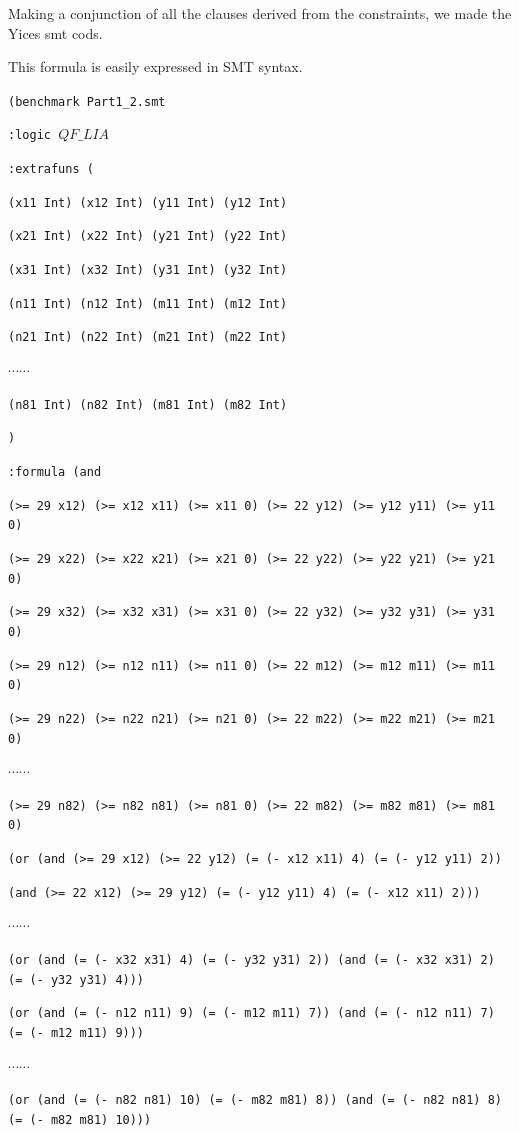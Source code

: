 \documentclass[11pt]{article}
\begin{document}
Making a conjunction of all the clauses derived from the constraints, we made the Yices smt cods.

This formula is easily expressed in SMT syntax.

{\footnotesize

{\tt (benchmark Part1\_2.smt}

{\tt :logic $QF\_LIA$}

{\tt :extrafuns (}

{\tt (x11 Int) (x12 Int) (y11 Int) (y12 Int)}

{\tt (x21 Int) (x22 Int) (y21 Int) (y22 Int)}

{\tt (x31 Int) (x32 Int) (y31 Int) (y32 Int)}

{\tt (n11 Int) (n12 Int) (m11 Int) (m12 Int)}

{\tt (n21 Int) (n22 Int) (m21 Int) (m22 Int)}

$\cdots \cdots$

{\tt (n81 Int) (n82 Int) (m81 Int) (m82 Int)}

{\tt )}

{\tt :formula (and}

{\tt (>= 29 x12) (>= x12 x11) (>= x11 0) (>= 22 y12) (>= y12 y11) (>= y11 0)}

{\tt (>= 29 x22) (>= x22 x21) (>= x21 0) (>= 22 y22) (>= y22 y21) (>= y21 0)}

{\tt (>= 29 x32) (>= x32 x31) (>= x31 0) (>= 22 y32) (>= y32 y31) (>= y31 0)}

{\tt (>= 29 n12) (>= n12 n11) (>= n11 0) (>= 22 m12) (>= m12 m11) (>= m11 0)}

{\tt (>= 29 n22) (>= n22 n21) (>= n21 0) (>= 22 m22) (>= m22 m21) (>= m21 0)}

$\cdots \cdots$

{\tt (>= 29 n82) (>= n82 n81) (>= n81 0) (>= 22 m82) (>= m82 m81) (>= m81 0)}

{\tt (or (and (>= 29 x12) (>= 22 y12) (= (- x12 x11) 4) (= (- y12 y11) 2))}

{\tt (and (>= 22 x12) (>= 29 y12) (= (- y12 y11) 4) (= (- x12 x11) 2)))}

$\cdots \cdots$

{\tt (or (and (= (- x32 x31) 4) (= (- y32 y31) 2)) (and (= (- x32 x31) 2) (= (- y32 y31) 4)))}

{\tt (or (and (= (- n12 n11) 9) (= (- m12 m11) 7)) (and (= (- n12 n11) 7) (= (- m12 m11) 9)))}

$\cdots \cdots$

{\tt (or (and (= (- n82 n81) 10) (= (- m82 m81) 8)) (and (= (- n82 n81) 8) (= (- m82 m81) 10)))}

}
\end{document}
